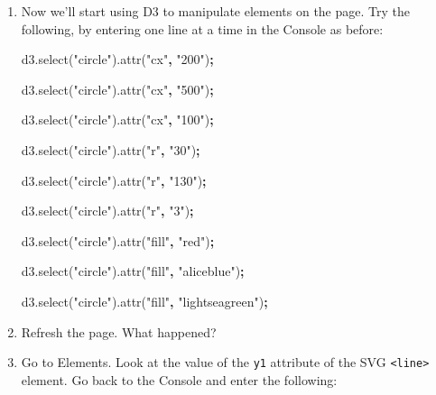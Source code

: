 \documentclass[]{book}
\newenvironment{Shaded}{\begin{snugshade}}{\end{snugshade}}
\newcommand{\AttributeTok}[1]{\textcolor[rgb]{0.77,0.63,0.00}{#1}}
\newcommand{\NormalTok}[1]{#1}
\newcommand{\OperatorTok}[1]{\textcolor[rgb]{0.81,0.36,0.00}{\textbf{#1}}}
\newcommand{\StringTok}[1]{\textcolor[rgb]{0.31,0.60,0.02}{#1}}
\newcommand{\VariableTok}[1]{\textcolor[rgb]{0.00,0.00,0.00}{#1}}
\begin{document}
\begin{enumerate}
\def\labelenumi{\arabic{enumi}.}
\item
  Now we'll start using D3 to manipulate elements on the page. Try the following, by entering one line at a time in the Console as before:

\begin{Shaded}
\begin{Highlighting}[]
\VariableTok{d3}\NormalTok{.}\AttributeTok{select}\NormalTok{(}\StringTok{"circle"}\NormalTok{).}\AttributeTok{attr}\NormalTok{(}\StringTok{"cx"}\OperatorTok{,} \StringTok{"200"}\NormalTok{)}\OperatorTok{;}

\VariableTok{d3}\NormalTok{.}\AttributeTok{select}\NormalTok{(}\StringTok{"circle"}\NormalTok{).}\AttributeTok{attr}\NormalTok{(}\StringTok{"cx"}\OperatorTok{,} \StringTok{"500"}\NormalTok{)}\OperatorTok{;}

\VariableTok{d3}\NormalTok{.}\AttributeTok{select}\NormalTok{(}\StringTok{"circle"}\NormalTok{).}\AttributeTok{attr}\NormalTok{(}\StringTok{"cx"}\OperatorTok{,} \StringTok{"100"}\NormalTok{)}\OperatorTok{;}

\VariableTok{d3}\NormalTok{.}\AttributeTok{select}\NormalTok{(}\StringTok{"circle"}\NormalTok{).}\AttributeTok{attr}\NormalTok{(}\StringTok{"r"}\OperatorTok{,} \StringTok{"30"}\NormalTok{)}\OperatorTok{;}

\VariableTok{d3}\NormalTok{.}\AttributeTok{select}\NormalTok{(}\StringTok{"circle"}\NormalTok{).}\AttributeTok{attr}\NormalTok{(}\StringTok{"r"}\OperatorTok{,} \StringTok{"130"}\NormalTok{)}\OperatorTok{;}

\VariableTok{d3}\NormalTok{.}\AttributeTok{select}\NormalTok{(}\StringTok{"circle"}\NormalTok{).}\AttributeTok{attr}\NormalTok{(}\StringTok{"r"}\OperatorTok{,} \StringTok{"3"}\NormalTok{)}\OperatorTok{;}

\VariableTok{d3}\NormalTok{.}\AttributeTok{select}\NormalTok{(}\StringTok{"circle"}\NormalTok{).}\AttributeTok{attr}\NormalTok{(}\StringTok{"fill"}\OperatorTok{,} \StringTok{"red"}\NormalTok{)}\OperatorTok{;}

\VariableTok{d3}\NormalTok{.}\AttributeTok{select}\NormalTok{(}\StringTok{"circle"}\NormalTok{).}\AttributeTok{attr}\NormalTok{(}\StringTok{"fill"}\OperatorTok{,} \StringTok{"aliceblue"}\NormalTok{)}\OperatorTok{;}

\VariableTok{d3}\NormalTok{.}\AttributeTok{select}\NormalTok{(}\StringTok{"circle"}\NormalTok{).}\AttributeTok{attr}\NormalTok{(}\StringTok{"fill"}\OperatorTok{,} \StringTok{"lightseagreen"}\NormalTok{)}\OperatorTok{;}
\end{Highlighting}
\end{Shaded}
\item
  Refresh the page. What happened?
\item
  Go to Elements. Look at the value of the \texttt{y1} attribute of the SVG \texttt{\textless{}line\textgreater{}} element. Go back to the Console and enter the following:


\end{enumerate}
\end{document}
